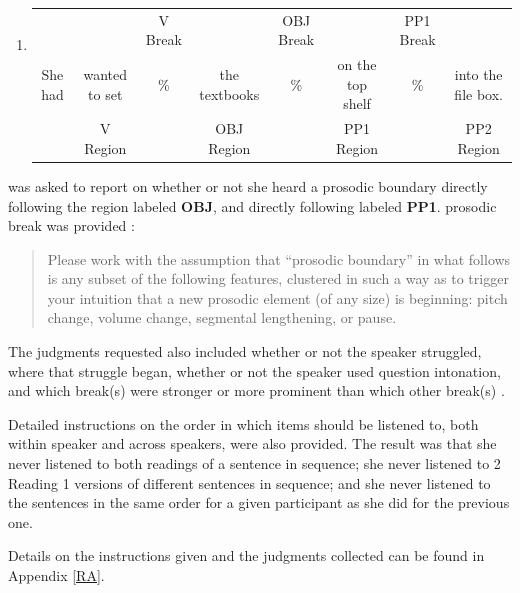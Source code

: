 \documentclass[12pt,oneside]{book}
\providecommand{\tightlist}{%
  \setlength{\itemsep}{0pt}\setlength{\parskip}{0pt}}
\begin{document}
\begin{enumerate}
\def\labelenumi{(\arabic{enumi})}
\setcounter{enumi}{35}
\tightlist
\item
  \begingroup
  \setlength{\tabcolsep}{1pt}

  \begin{tabular}{cccccccc}
    & & \footnotesize V Break & & \footnotesize OBJ Break & & \footnotesize PP1 Break & \\
    She had & wanted to set & \% & the textbooks & \% & on the top shelf & \% & into the file box. \\
    \cmidrule(r){2-2} \cmidrule(r){4-4} \cmidrule(r){6-6} \cmidrule(r){8-8} 
    & \footnotesize V Region & & \footnotesize OBJ Region & & \footnotesize PP1 Region & & PP2 Region \\
  \end{tabular}
    \endgroup
\end{enumerate}

 was asked to report on whether or not she heard a prosodic boundary directly following the region labeled \textbf{OBJ}, and directly  following  labeled \textbf{PP1}.  prosodic break was provided :

\begin{quote}
Please work with the assumption that ``prosodic boundary'' in what follows is any subset of the following features, clustered in such a way as to trigger your intuition that a new prosodic element (of any size) is beginning: pitch change, volume change, segmental lengthening, or pause.
\end{quote}

The judgments requested also included whether or not the speaker struggled, where that struggle began, whether or not the speaker used question intonation, and which break(s) were stronger or more prominent than which other break(s) .

Detailed instructions on the order in which items should be listened to, both within speaker and across speakers, were also provided. The result was that she never listened to both readings of a sentence in sequence; she never listened to 2 Reading 1 versions of different sentences in sequence; and she never listened to the sentences in the same order for a given participant as she did for the previous one.

Details on the instructions given and the judgments collected can be found in Appendix \ref{RA}.
\end{document}
